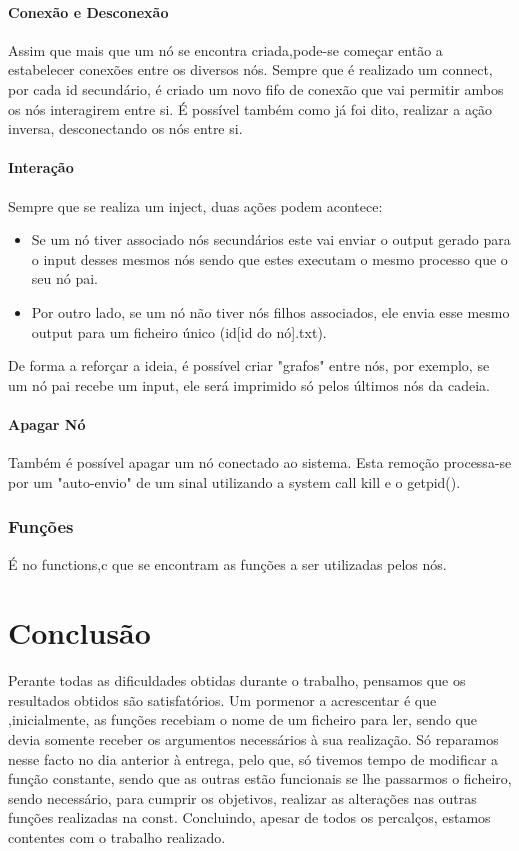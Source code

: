 \documentclass{report}
\begin{document}
\subsubsection{Conexão e Desconexão}
Assim que mais que um nó se encontra criada,pode-se começar então a estabelecer conexões entre os diversos nós. Sempre que é realizado um connect, por cada id secundário, é criado um novo fifo de conexão que vai permitir ambos os nós interagirem entre si. É possível também como já foi dito, realizar a ação inversa, desconectando os nós entre si.

\subsubsection{Interação}
Sempre que se realiza um inject, duas ações podem acontece:
\begin{itemize}
    \item Se um nó tiver associado nós secundários este vai enviar o output gerado para o input desses mesmos nós sendo que estes executam o mesmo processo que o seu nó pai.
    \item Por outro lado, se um nó não tiver nós filhos associados, ele envia esse mesmo output para um ficheiro único (id[id do nó].txt).
\end{itemize}
De forma a reforçar a ideia, é possível criar "grafos" entre nós, por exemplo, se um nó pai recebe um input, ele será imprimido só pelos últimos nós da cadeia.

\subsubsection{Apagar Nó}
Também é possível apagar um nó conectado ao sistema. Esta remoção processa-se por um "auto-envio" de um sinal utilizando a system call kill e o getpid().

\subsection{Funções}
É no functions,c que se encontram as funções a ser utilizadas pelos nós.

\newpage
\chapter{Conclusão}
Perante todas as dificuldades obtidas durante o trabalho, pensamos que os resultados obtidos são satisfatórios. Um pormenor a acrescentar é que ,inicialmente, as funções recebiam o nome de um ficheiro para ler, sendo que devia somente receber os argumentos necessários à sua realização. Só reparamos nesse facto no dia anterior à entrega, pelo que, só tivemos tempo de modificar a função constante, sendo que as outras estão funcionais se lhe passarmos o ficheiro, sendo necessário, para cumprir os objetivos, realizar as alterações nas outras funções realizadas na const.
Concluindo, apesar de todos os percalços, estamos contentes com o trabalho realizado.
\end{document}
